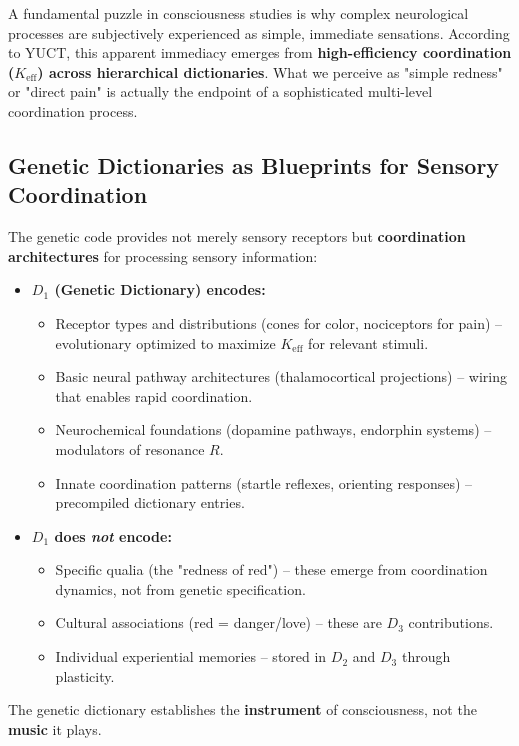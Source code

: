 \documentclass[12pt,a4paper]{article}
\newcommand{\eff}{\mathrm{eff}}
\newcommand{\Ke}{K_{\eff}}
\begin{document}
	A fundamental puzzle in consciousness studies is why complex neurological processes are subjectively experienced as simple, immediate sensations. According to YUCT, this apparent immediacy emerges from \textbf{high-efficiency coordination ($\Ke$) across hierarchical dictionaries}. What we perceive as "simple redness" or "direct pain" is actually the endpoint of a sophisticated multi-level coordination process.
	
	\subsection{Genetic Dictionaries as Blueprints for Sensory Coordination}
	
	The genetic code provides not merely sensory receptors but \textbf{coordination architectures} for processing sensory information:
	
	\begin{itemize}
		\item \textbf{$D_1$ (Genetic Dictionary) encodes:}
		\begin{itemize}
			\item Receptor types and distributions (cones for color, nociceptors for pain) – evolutionary optimized to maximize $\Ke$ for relevant stimuli.
			\item Basic neural pathway architectures (thalamocortical projections) – wiring that enables rapid coordination.
			\item Neurochemical foundations (dopamine pathways, endorphin systems) – modulators of resonance $R$.
			\item Innate coordination patterns (startle reflexes, orienting responses) – precompiled dictionary entries.
		\end{itemize}
		
		\item \textbf{$D_1$ does \textit{not} encode:}
		\begin{itemize}
			\item Specific qualia (the "redness of red") – these emerge from coordination dynamics, not from genetic specification.
			\item Cultural associations (red = danger/love) – these are $D_3$ contributions.
			\item Individual experiential memories – stored in $D_2$ and $D_3$ through plasticity.
		\end{itemize}
	\end{itemize}
	
	The genetic dictionary establishes the \textbf{instrument} of consciousness, not the \textbf{music} it plays.
	
\end{document}
